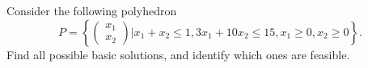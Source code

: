 
Consider the following polyhedron
$$P = \left\{
\begin{pmatrix}
x_1\\
x_2
\end{pmatrix}
| x_1 + x_2 \leq 1, 3 x_1 + 10 x_2 \leq 15, x_1 \geq 0, x_2 \geq 0 \right\}.$$
Find all possible basic solutions, and identify which ones are feasible.




